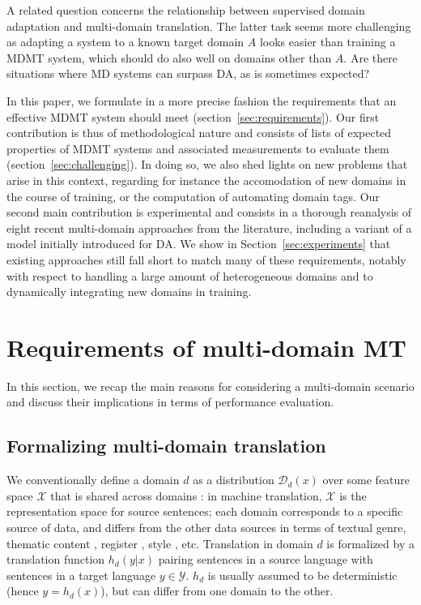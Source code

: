 \documentclass[11pt,a4paper]{article}
\newcommand{\fyDone}[1]{\done[FY]\Todo[FY:]{\textcolor{orange}{#1}}}
\begin{document}
A related question concerns the relationship between supervised domain adaptation and multi-domain translation. The latter task seems more challenging as adapting a system to a known target domain $A$ looks easier than training a MDMT system, which should do also well on domains other than $A$. Are there situations where MD systems can surpass DA, as is sometimes expected?
 
In this paper, we formulate in a more precise fashion the requirements that an effective MDMT system should meet (section~\ref{sec:requirements}). Our first contribution is thus of methodological nature and consists of lists of expected properties of MDMT systems and associated measurements to evaluate them (section~\ref{sec:challenging}). In doing so, we also shed lights on new problems that arise in this context, regarding for instance the accomodation of new domains in the course of training, or the computation of automating domain tags.\fyDone{New problems - continuous learning, automatic domains} Our second main contribution is experimental and consists in a thorough reanalysis of eight recent multi-domain approaches from the literature, including a variant of a model initially introduced for DA. We show in Section~\ref{sec:experiments} that existing approaches still fall short to match many of these requirements, notably with respect to handling a large amount of heterogeneous domains and to dynamically integrating new domains in training.\fyDone{Spell out conclusions}
 
\section{Requirements of multi-domain MT \label{sec:requirements}}
In this section, we recap the main reasons for considering a multi-domain scenario and discuss their implications in terms of performance evaluation.
\fyDone{Relation to theory, discussion of worst case scenario}
\fyDone{Insist on the work of Dredze}

\subsection{Formalizing multi-domain translation \label{ssec:formalization}}

We conventionally define a domain $d$ as a distribution $\mathcal{D}_d(x)$ over some feature space $\mathcal{X}$ that is shared across domains \cite{Pan10asurvey}: in machine translation, $\mathcal{X}$ is the representation space for source sentences; each domain corresponds to a specific source of data, and differs from the other data sources in terms of textual genre, thematic content \cite{Chen16guided,Zhang16topicinformed}, register \cite{Sennrich16politeness}, style \cite{Niu18multitask}, etc. Translation in domain $d$ is formalized by a translation function $h_d(y|x)$ pairing sentences in a source language with sentences in a target language $y \in \mathcal{Y}$. $h_d$ is usually assumed to be deterministic (hence $y = h_d(x)$), but can differ from one domain to the other.
\end{document}
